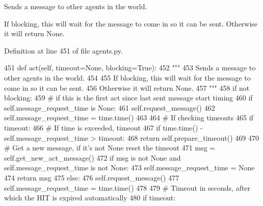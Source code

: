 \begin{DoxyVerb}Sends a message to other agents in the world.

If blocking, this will wait for the message to come in so it can be sent.
Otherwise it will return None.
\end{DoxyVerb}
 

Definition at line 451 of file agents.\+py.


\begin{DoxyCode}
451     \textcolor{keyword}{def }act(self, timeout=None, blocking=True):
452         \textcolor{stringliteral}{"""}
453 \textcolor{stringliteral}{        Sends a message to other agents in the world.}
454 \textcolor{stringliteral}{}
455 \textcolor{stringliteral}{        If blocking, this will wait for the message to come in so it can be sent.}
456 \textcolor{stringliteral}{        Otherwise it will return None.}
457 \textcolor{stringliteral}{        """}
458         \textcolor{keywordflow}{if} \textcolor{keywordflow}{not} blocking:
459             \textcolor{comment}{# if this is the first act since last sent message start timing}
460             \textcolor{keywordflow}{if} self.message\_request\_time \textcolor{keywordflow}{is} \textcolor{keywordtype}{None}:
461                 self.request\_message()
462                 self.message\_request\_time = time.time()
463 
464             \textcolor{comment}{# If checking timeouts}
465             \textcolor{keywordflow}{if} timeout:
466                 \textcolor{comment}{# If time is exceeded, timeout}
467                 \textcolor{keywordflow}{if} time.time() - self.message\_request\_time > timeout:
468                     \textcolor{keywordflow}{return} self.prepare\_timeout()
469 
470             \textcolor{comment}{# Get a new message, if it's not None reset the timeout}
471             msg = self.get\_new\_act\_message()
472             \textcolor{keywordflow}{if} msg \textcolor{keywordflow}{is} \textcolor{keywordflow}{not} \textcolor{keywordtype}{None} \textcolor{keywordflow}{and} self.message\_request\_time \textcolor{keywordflow}{is} \textcolor{keywordflow}{not} \textcolor{keywordtype}{None}:
473                 self.message\_request\_time = \textcolor{keywordtype}{None}
474             \textcolor{keywordflow}{return} msg
475         \textcolor{keywordflow}{else}:
476             self.request\_message()
477             self.message\_request\_time = time.time()
478 
479             \textcolor{comment}{# Timeout in seconds, after which the HIT is expired automatically}
480             \textcolor{keywordflow}{if} timeout:

\end{DoxyCode}
